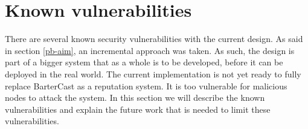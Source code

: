 \chapter{Known vulnerabilities}
\label{problems}
There are several known security vulnerabilities with the current design.
As said in section \ref{pb-aim}, an incremental approach was taken.
As such, the design is part of a bigger system that as a whole is to be developed,
before it can be deployed in the real world.
The current implementation is not yet ready to fully replace BarterCast as a reputation system.
It is too vulnerable for malicious nodes to attack the system.
In this section we will describe the known vulnerabilities
and explain the future work that is needed to limit these vulnerabilities.










